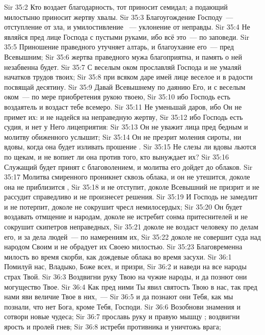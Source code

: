 \vs Sir 35:2 Кто воздает благодарность, тот приносит семидал; а подающий милостыню приносит жертву хвалы.
\vs Sir 35:3 Благоугождение Господу~--- отступление от зла, и умилостивление ~--- уклонение от неправды.
\vs Sir 35:4 Не являйся пред лице Господа с пустыми руками, ибо всё это~--- по заповеди.
\vs Sir 35:5 Приношение праведного утучняет алтарь, и благоухание его~--- пред Всевышним;
\vs Sir 35:6 жертва праведного мужа благоприятна, и память о ней незабвенна будет.
\vs Sir 35:7 С веселым оком прославляй Господа и не умаляй начатков трудов твоих;
\vs Sir 35:8 при всяком даре имей лице веселое и в радости посвящай десятину.
\vs Sir 35:9 Давай Всевышнему по даянию Его, и с веселым оком~--- по мере приобретения рукою твоею,
\vs Sir 35:10 ибо Господь есть воздаятель и воздаст тебе всемеро.
\vs Sir 35:11 Не уменьшай даров, ибо Он не примет их: и не надейся на неправедную жертву,
\vs Sir 35:12 ибо Господь есть судия, и нет у Него лицеприятия:
\vs Sir 35:13 Он не уважит лица пред бедным и молитву обиженного услышит;
\vs Sir 35:14 Он не презрит моления сироты, ни вдовы, когда она будет изливать прошение .
\vs Sir 35:15 Не слезы ли вдовы льются по щекам, и не вопиет ли она против того, кто вынуждает их?
\vs Sir 35:16 Служащий  будет принят с благоволением, и молитва его дойдет до облаков.
\vs Sir 35:17 Молитва смиренного проникнет сквозь облака, и он не утешится, доколе она не приблизится ,
\vs Sir 35:18 и не отступит, доколе Всевышний не призрит и не рассудит справедливо и не произнесет решения.
\vs Sir 35:19 И Господь не замедлит и не потерпит, доколе не сокрушит чресл немилосердых;
\vs Sir 35:20 Он будет воздавать отмщение и народам, доколе не истребит сонма притеснителей и не сокрушит скипетров неправедных,
\vs Sir 35:21 доколе не воздаст человеку по делам его, и за дела людей~--- по намерениям их,
\vs Sir 35:22 доколе не совершит суда над народом Своим и не обрадует их Своею милостью.
\vs Sir 35:23 Благовременна милость во время скорби, как дождевые облака во время засухи.
\vs Sir 36:1 Помилуй нас, Владыко, Боже всех, и призри,
\vs Sir 36:2 и наведи на все народы страх Твой.
\vs Sir 36:3 Воздвигни руку Твою на чужие народы, и да познют они могущество Твое.
\vs Sir 36:4 Как пред ними Ты явил святость Твою в нас, так пред нами яви величие Твое в них,~---
\vs Sir 36:5 и да познают они Тебя, как мы познали, что нет Бога, кроме Тебя, Господи.
\vs Sir 36:6 Возобнови знамения и сотвори новые чудеса;
\vs Sir 36:7 прославь руку и правую мышцу ; воздвигни ярость и пролей гнев;
\vs Sir 36:8 истреби противника и уничтожь врага;
